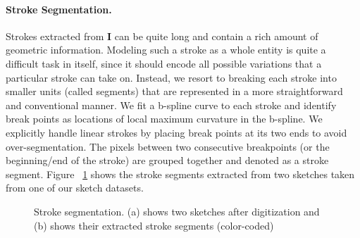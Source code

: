 \vspace{-2mm}
\paragraph{Stroke Segmentation.} Strokes extracted from $\mathbf{I}$ can be quite long and contain a rich amount of geometric information. Modeling such a stroke as a whole entity is quite a difficult task in itself, since it should encode all possible variations that a particular stroke can take on. Instead, we resort to breaking each stroke into smaller units (called segments) that are represented in a more straightforward and conventional manner. We fit a b-spline curve to each stroke and identify break points as locations of local maximum curvature in the b-spline. We explicitly handle linear strokes by placing break points at its two ends to avoid over-segmentation. The pixels between two consecutive breakpoints (or the beginning/end of the stroke) are grouped together and denoted as a stroke segment. Figure ~\ref{fig:Figure3} shows the stroke segments extracted from two sketches taken from one of our sketch datasets.


\begin{figure}[htbp]
\centering
{}
\vspace{-3mm}
\caption {Stroke segmentation. (a) shows two sketches after digitization and (b) shows their extracted stroke segments (color-coded)}\vspace{-3mm}
\label {fig:Figure3}
\end{figure}

